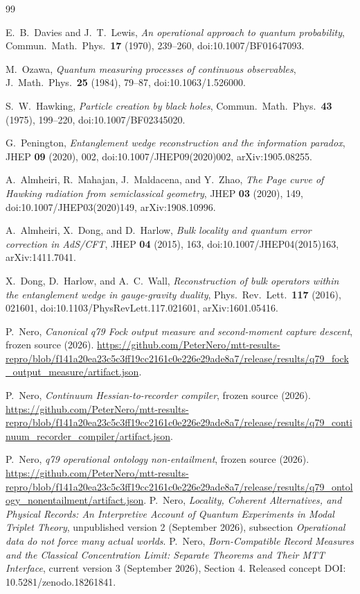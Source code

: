 \documentclass[11pt]{article}
\begin{document}
\begin{thebibliography}{99}
\raggedright

E.~B.~Davies and J.~T.~Lewis,
\emph{An operational approach to quantum probability},
Commun.\ Math.\ Phys.\ \textbf{17} (1970), 239--260,
doi:10.1007/BF01647093.

M.~Ozawa,
\emph{Quantum measuring processes of continuous observables},
J.\ Math.\ Phys.\ \textbf{25} (1984), 79--87,
doi:10.1063/1.526000.

S.~W.~Hawking,
\emph{Particle creation by black holes},
Commun.\ Math.\ Phys.\ \textbf{43} (1975), 199--220,
doi:10.1007/BF02345020.

G.~Penington,
\emph{Entanglement wedge reconstruction and the information paradox},
JHEP \textbf{09} (2020), 002,
doi:10.1007/JHEP09(2020)002,
arXiv:1905.08255.

A.~Almheiri, R.~Mahajan, J.~Maldacena, and Y.~Zhao,
\emph{The Page curve of Hawking radiation from semiclassical geometry},
JHEP \textbf{03} (2020), 149,
doi:10.1007/JHEP03(2020)149,
arXiv:1908.10996.

A.~Almheiri, X.~Dong, and D.~Harlow,
\emph{Bulk locality and quantum error correction in AdS/CFT},
JHEP \textbf{04} (2015), 163,
doi:10.1007/JHEP04(2015)163,
arXiv:1411.7041.

X.~Dong, D.~Harlow, and A.~C.~Wall,
\emph{Reconstruction of bulk operators within the entanglement wedge in
gauge-gravity duality},
Phys.\ Rev.\ Lett.\ \textbf{117} (2016), 021601,
doi:10.1103/PhysRevLett.117.021601,
arXiv:1601.05416.

P.~Nero, \emph{Canonical q79 Fock output measure and second-moment capture descent}, frozen source (2026).
\url{https://github.com/PeterNero/mtt-results-repro/blob/f141a20ea23c5c3ff19cc2161c0e226e29ade8a7/release/results/q79_fock_output_measure/artifact.json}.

P.~Nero, \emph{Continuum Hessian-to-recorder compiler}, frozen source (2026).
\url{https://github.com/PeterNero/mtt-results-repro/blob/f141a20ea23c5c3ff19cc2161c0e226e29ade8a7/release/results/q79_continuum_recorder_compiler/artifact.json}.

P.~Nero, \emph{q79 operational ontology non-entailment}, frozen source (2026).
\url{https://github.com/PeterNero/mtt-results-repro/blob/f141a20ea23c5c3ff19cc2161c0e226e29ade8a7/release/results/q79_ontology_nonentailment/artifact.json}.
P.~Nero, \emph{Locality, Coherent Alternatives, and Physical Records:
An Interpretive Account of Quantum Experiments in Modal Triplet Theory},
unpublished version 2 (September 2026), subsection \emph{Operational data do not
force many actual worlds}.
P.~Nero, \emph{Born-Compatible Record Measures and the Classical Concentration
Limit: Separate Theorems and Their MTT Interface}, current version 3
(September 2026), Section 4. Released concept DOI: 10.5281/zenodo.18261841.

\end{thebibliography}
\end{document}
